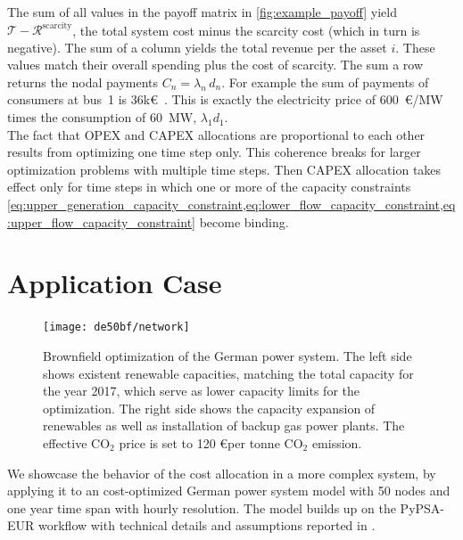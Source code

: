 \documentclass[11pt,twocolumn]{article}
\newcommand{\kk}{k\euro~}
\newcommand{\totalcost}{\mathcal{T}}
\newcommand{\remainingcost}{\mathcal{R}}
\newcommand{\scarcitycost}{\remainingcost^\text{scarcity}}
\begin{document}
% 
The sum of all values in the payoff matrix in \cref{fig:example_payoff} yield $\totalcost - \scarcitycost$, the total system cost minus the scarcity cost (which in turn is negative).
The sum of a column  yields the total revenue per the asset $i$. These values match their overall spending plus the cost of scarcity. The sum a row returns the nodal payments $C_n = \lambda_n \, d_n$. For example the sum of payments of consumers at bus~1 is 36\kk. This is exactly the electricity price of 600~\euro/MW times the consumption of 60~MW, $\lambda_1 d_1$. \\
% 

The fact that OPEX and CAPEX allocations are proportional to each other results from optimizing one time step only. This coherence breaks for larger optimization problems with multiple time steps. Then CAPEX allocation takes effect only for time steps in which one or more of the capacity constraints  \cref{eq:upper_generation_capacity_constraint,eq:lower_flow_capacity_constraint,eq:upper_flow_capacity_constraint} become binding.  \\



\section{Application Case}
\label{sec:application_case}
% 
\begin{figure}[t]
    \centering
    \texttt{[image: de50bf/network]}
    \caption{Brownfield optimization of the German power system. The left side shows existent renewable capacities, matching the total capacity for the year 2017, which serve as lower capacity limits for the optimization. The right side shows the capacity expansion of renewables as well as installation of backup gas power plants. The effective CO$_2$ price is set to 120 \euro per tonne CO$_2$ emission.}
    \label{fig:network}
\end{figure}
% 
We showcase the behavior of the cost allocation in a more complex system, by applying it to an cost-optimized German power system model with 50 nodes and one year time span with hourly resolution. The model builds up on the PyPSA-EUR workflow \cite{horsch_jonas_pypsa-eur_2020} with technical details and assumptions reported in \cite{horsch_pypsa-eur_2018}. 
\end{document}
